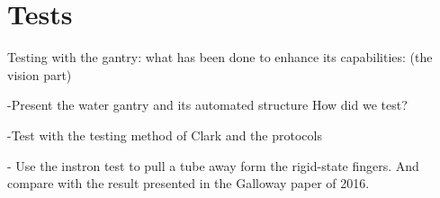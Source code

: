 \section{Tests}
\label{s:Tests}

Testing with the gantry: what has been done to enhance its capabilities: (the vision part)

-Present the water gantry and its automated structure
How did we test?

-Test with the testing method of Clark and the protocols

-\cite{galloway2016soft}
Use the instron test to pull a tube away form the rigid-state fingers. And compare with the result presented in the Galloway paper of 2016.
